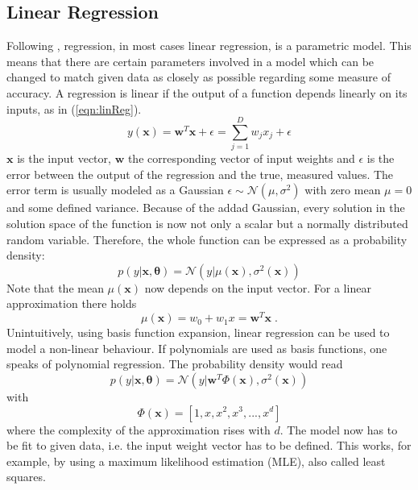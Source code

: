 \documentclass[%
  a4paper,oneside,%
  11pt,%
  smallchapters,
  style=printdev,
  extramargin,
  green,%
  rgb, <cmyk>
  ]{tubsbook}
\begin{document}
\subsection{Linear Regression}
Following \cite{murphy2012}, regression, in most cases linear regression, is a parametric model. This means that there are certain parameters involved in a model which can be changed to match given data as closely as possible regarding some measure of accuracy. A regression is linear if the output of a function depends linearly on its inputs, as in (\ref{eqn:linReg}). \cite[p. 19]{murphy2012}
%
\begin{equation}
y(\bm{x}) = \bm{w}^T \bm{x} + \epsilon = \sum_{j = 1}^D w_jx_j + \epsilon
\label{eqn:linReg}
\end{equation}
%
$\bm{x}$ is the input vector, $\bm{w}$ the corresponding vector of input weights and $\epsilon$ is the error between the output of the regression and the true, measured values. The error term is usually modeled as a Gaussian $\epsilon \sim \mathcal{N}(\mu,\sigma^2)$ with zero mean $\mu = 0$ and some defined variance. Because of the addad Gaussian, every solution in the solution space of the function is now not only a scalar but a normally distributed random variable. Therefore, the whole function can be expressed as a probability density:
%
\begin{equation}
p(y|\bm{x},\bm{\theta}) = \mathcal{N}(y|\mu(\bm{x}),\sigma^2(\bm{x}))
\end{equation}
%
Note that the mean $\mu(\bm{x})$ now depends on the input vector. For a linear approximation there holds
\begin{equation}
\mu (\bm{x}) = w_0 + w_1x= \bm{w}^T\bm{x} \;.
\end{equation}
Unintuitively, using basis function expansion, linear regression can be used to model a non-linear behaviour. If polynomials are used as basis functions, one speaks of polynomial regression. The probability density would read
\begin{equation}
p(y|\bm{x},\bm{\theta}) = \mathcal{N}(y|\bm{w}^T\Phi(\bm{x}),\sigma^2(\bm{x}))
\end{equation}
with 
\begin{equation}
\Phi(\bm{x}) = [1,x,x^2,x^3,...,x^d]
\end{equation}
where the complexity of the approximation rises with $d$. \cite[p. 20]{murphy2012}
The model now has to be fit to given data, i.e. the input weight vector has to be defined. This works, for example, by using a maximum likelihood estimation (MLE), also called least squares.
\end{document}
